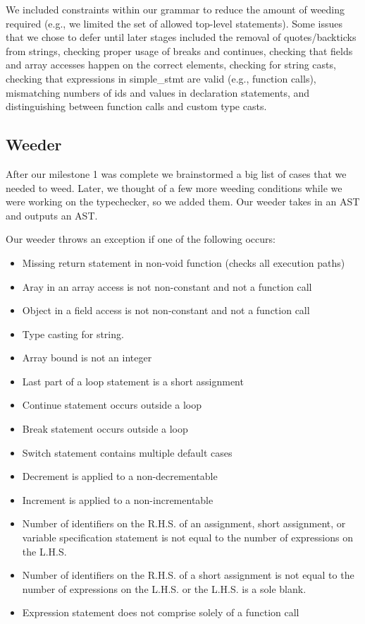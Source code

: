 \documentclass{article}
\begin{document}
We included constraints within our grammar to reduce the amount of weeding required (e.g., we limited the set of allowed top-level statements). Some issues that we chose to defer until later stages included the removal of quotes/backticks from strings, checking proper usage of breaks and continues, checking that fields and array accesses happen on the correct elements, checking for string casts, checking that expressions in simple\_stmt are valid (e.g., function calls), mismatching numbers of ids and values in declaration statements, and distinguishing between function calls and custom type casts.

\subsection{Weeder}

After our milestone 1 was complete we brainstormed a big list of cases that we needed to weed. Later, we thought of a few more weeding conditions while we were working on the typechecker, so we added them. Our weeder takes in an AST and outputs an AST.

Our weeder throws an exception if one of the following occurs:
\begin{itemize}
\item Missing return statement in non-void function (checks all execution paths)
\item Aray in an array access is not non-constant and not a function call
\item Object in a field access is not non-constant and not a function call
\item Type casting for string.
\item Array bound is not an integer
\item Last part of a loop statement is a short assignment
\item Continue statement occurs outside a loop
\item Break statement occurs outside a loop
\item Switch statement contains multiple default cases
\item Decrement is applied to a non-decrementable
\item Increment is applied to a non-incrementable
\item Number of identifiers on the R.H.S. of an assignment, short assignment, or variable specification statement is not equal to the number of expressions on the L.H.S.
\item Number of identifiers on the R.H.S. of a short assignment is not equal to the number of expressions on the L.H.S. or the L.H.S. is a sole blank.
\item Expression statement does not comprise solely of a function call
\end{itemize}
\end{document}
